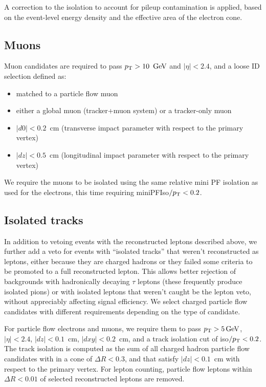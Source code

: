 A correction to the isolation to account for pileup contamination is applied, based on the event-level energy
density and the effective area of the electron cone.

\subsection{Muons}

Muon candidates are required to pass $p_{\mathrm{T}}>10~\,\text{Ge\hspace{-.08em}V}$ and $|\eta|<2.4$, and a loose ID selection defined as:
\begin{itemize}\setlength\itemsep{-1mm}
\item matched to a particle flow muon
\item either a global muon (tracker+muon system) or a tracker-only muon
\item $|d0|<0.2$~cm (transverse impact parameter with respect to the primary vertex)
\item $|dz|<0.5$~cm (longitudinal impact parameter with respect to the primary vertex)
\end{itemize}

We require the muons to be isolated using the same relative mini PF isolation as used for the electrons,
this time requiring miniPFIso$/p_{\mathrm{T}}<0.2$.

\subsection{Isolated tracks}

In addition to vetoing events with the reconstructed leptons described above, we further add a veto
for events with ``isolated tracks'' that weren't reconstructed as leptons, either because
they are charged hadrons or they failed some criteria to be promoted to a full reconstructed lepton.
This allows better rejection of backgrounds with hadronically decaying $\tau$ leptons (these frequently
produce isolated pions) or with isolated leptons that weren't caught be the lepton veto, without
appreciably affecting signal efficiency.
We select charged particle flow candidates with different requirements depending on the type of candidate.

For particle flow electrons and muons, we require them to pass $p_{\mathrm{T}}>5\,\text{Ge\hspace{-.08em}V}$, $|\eta|<2.4$, $|dz|<0.1$~cm,
$|dxy|<0.2$~cm, and a track isolation cut of iso$/p_{\mathrm{T}}<0.2$. The track isolation is computed as the sum
of all charged hadron particle flow candidates with in a cone of $\Delta R<0.3$, and that satisfy 
$|dz|<0.1$~cm with respect to the primary vertex. For lepton counting, particle flow leptons
within $\Delta R<0.01$ of selected reconstructed leptons are removed.


